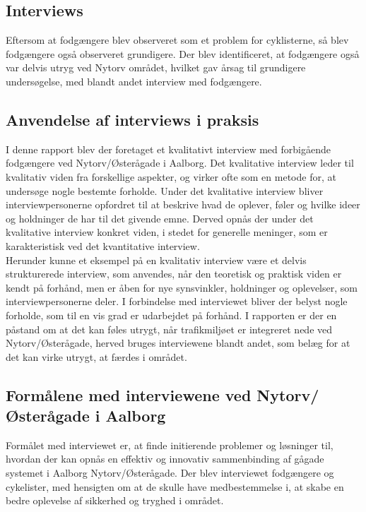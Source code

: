 \subsection{Interviews}
Eftersom at fodgængere blev observeret som et problem for cyklisterne, så blev fodgængere også observeret grundigere. Der blev identificeret, at fodgængere også var delvis utryg ved Nytorv området, hvilket gav årsag til grundigere undersøgelse, med blandt andet interview med fodgængere.%


\subsection{Anvendelse af interviews i praksis}
I denne rapport blev der foretaget et kvalitativt interview med forbigående fodgængere ved Nytorv/Østerågade i Aalborg. Det kvalitative interview leder til kvalitativ viden fra forskellige aspekter, og virker ofte som en metode for, at undersøge nogle bestemte forholde. Under det kvalitative interview bliver interviewpersonerne opfordret til at beskrive hvad de oplever, føler og hvilke ideer og holdninger de har til det givende emne. Derved opnås der under det kvalitative interview konkret viden, i stedet for generelle meninger, som er karakteristisk ved det kvantitative interview. %
\\

Herunder kunne et eksempel på en kvalitativ interview være et delvis strukturerede interview, som anvendes, når den teoretisk og praktisk viden er kendt på forhånd, men er åben for nye synsvinkler, holdninger og oplevelser, som interviewpersonerne deler. I forbindelse med interviewet bliver der belyst nogle forholde, som til en vis grad er udarbejdet på forhånd. I rapporten er der en påstand om at det kan føles utrygt, når trafikmiljøet er integreret nede ved Nytorv/Østerågade, herved bruges interviewene blandt andet, som belæg for at det kan virke utrygt, at færdes i området. %


\subsection{Formålene med interviewene ved Nytorv/Østerågade i Aalborg}
Formålet med interviewet er, at finde initierende problemer og løsninger til, hvordan der kan opnås en effektiv og innovativ sammenbinding af gågade systemet i Aalborg Nytorv/Østerågade. Der blev interviewet fodgængere og cykelister, med hensigten om at de skulle have medbestemmelse i, at skabe en bedre oplevelse af sikkerhed og tryghed i området.
\\


